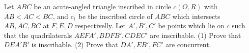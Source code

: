 Let $ABC$ be an acute-angled triangle inscribed in circle $c(O,R)$ with $AB<AC<BC$,
and $c_1$ be the inscribed circle of $ABC$ which intersects $AB, AC, BC$ at
$F, E, D$ respectivelly. Let $A', B', C'$ be points which lie on $c$ such that the quadrilaterals
$AEFA', BDFB', CDEC'$ are inscribable.
(1) Prove that $DEA'B'$ is inscribable.
(2) Prove that $DA', EB', FC'$ are concurrent.